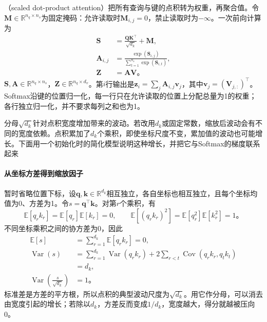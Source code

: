 （scaled dot-product attention）把所有查询与键的点积转为权重，再聚合值。令$\bm M\in\mathbb R^{n_q\times n_s}$为固定掩码：允许读取时$\bm M_{i,j}=0$，禁止读取时为$-\infty$。一次前向计算为
\begin{equation}
  \begin{aligned}
    \bm S&=\frac{\bm Q\bm K^{\top}}{\sqrt{d_k}}+\bm M,\\
    \bm A_{i,j}&=\frac{\exp(\bm S_{i,j})}
      {\sum_{t=1}^{n_s}\exp(\bm S_{i,t})},\\
    \bm Z&=\bm A\bm V\text{。}
  \end{aligned}
  \label{eq:transformer-attention}
\end{equation}
$\bm S,\bm A\in\mathbb R^{n_q\times n_s}$，$\bm Z\in\mathbb R^{n_q\times d_v}$。第$i$行输出是$\bm z_i=\sum_j\bm A_{i,j}\bm v_j$，其中$\bm v_j=(\bm V_{j,:})^{\top}$。Softmax沿键的位置归一化，每一行只在允许读取的位置上分配总量为1的权重；各行独立归一化，并不要求每列之和也为1。

分母$\sqrt{d_k}$针对点积宽度增加带来的波动。若改用$d_k$或固定常数，缩放后波动会有不同的宽度依赖。点积累加了$d_k$个乘积，即使坐标尺度不变，累加值的波动也可能增长。下面用一个初始化时的简化模型说明这种增长，并把它与Softmax的梯度联系起来

\paragraph{从坐标方差得到缩放因子}
暂时省略位置下标，设$\bm q,\bm k\in\mathbb R^{d_k}$相互独立，各自坐标也相互独立，且每个坐标均值为0、方差为1。令$s=\bm q^{\top}\bm k$。对第$r$个乘积，有
\[
  \mathbb E[q_rk_r]=\mathbb E[q_r]\mathbb E[k_r]=0,\qquad
  \mathbb E[(q_rk_r)^2]=\mathbb E[q_r^2]\mathbb E[k_r^2]=1\text{。}
\]
不同坐标乘积之间的协方差为0，因此
\begin{equation}
  \begin{aligned}
    \mathbb E[s]&=\sum_{r=1}^{d_k}\mathbb E[q_rk_r]=0,\\
    \operatorname{Var}(s)
      &=\sum_{r=1}^{d_k}\operatorname{Var}(q_rk_r)
        +2\sum_{r<t}\operatorname{Cov}(q_rk_r,q_tk_t)\\
      &=d_k,\\
    \operatorname{Var}\!\left(\frac{s}{\sqrt{d_k}}\right)&=1\text{。}
  \end{aligned}
  \label{eq:transformer-attention-scale-variance}
\end{equation}
标准差是方差的平方根，所以点积的典型波动尺度为$\sqrt{d_k}$。用它作分母，可以消去由宽度引起的增长；若除以$d_k$，方差反而变成$1/d_k$，宽度越大，得分就越被压向0。

